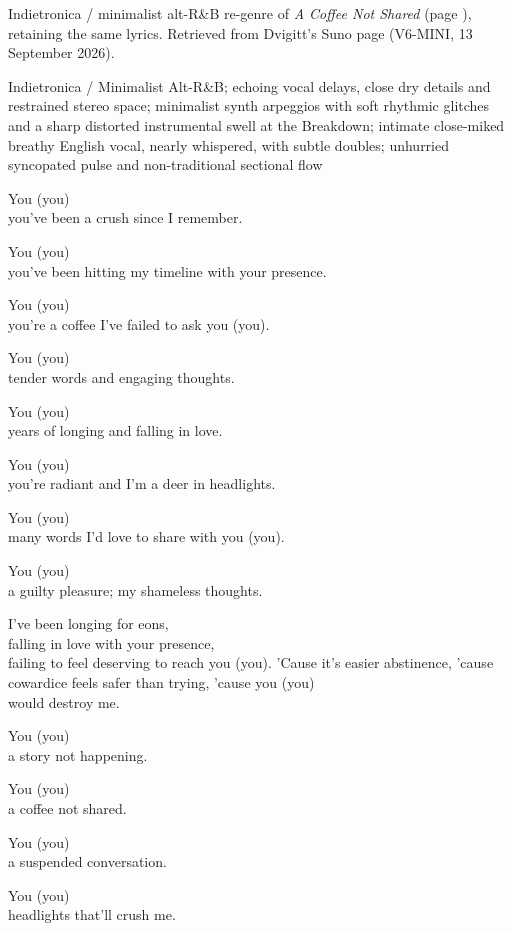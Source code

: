 
\begin{notes}
Indietronica / minimalist alt-R\&B re-genre of \emph{A Coffee Not Shared} (page \pageref{sec:a-coffee-not-shared}), retaining the same lyrics. Retrieved from Dvigitt's Suno page (V6-MINI, 13 September 2026).
\end{notes}
\begin{style}
Indietronica / Minimalist Alt-R\&B; echoing vocal delays, close dry details and restrained stereo space; minimalist synth arpeggios with soft rhythmic glitches and a sharp distorted instrumental swell at the Breakdown; intimate close-miked breathy English vocal, nearly whispered, with subtle doubles; unhurried syncopated pulse and non-traditional sectional flow
\end{style}
\begin{lyrics}
You (you)\\
you've been a crush since I remember.

You (you)\\
you've been hitting my timeline with your presence.

You (you)\\
you're a coffee I've failed to ask you (you).

You (you)\\
tender words and engaging thoughts.


You (you)\\
years of longing and falling in love.

You (you)\\
you're radiant and I'm a deer in headlights.

You (you)\\
many words I'd love to share with you (you).

You (you)\\
a guilty pleasure; my shameless thoughts.

I've been longing for eons,\\
falling in love with your presence,\\
failing to feel deserving to reach you (you).
'Cause it's easier abstinence,
'cause cowardice feels safer than trying,
'cause you (you)\\
would destroy me.

You (you)\\
a story not happening.

You (you)\\
a coffee not shared.

You (you)\\
a suspended conversation.

You (you)\\
headlights that'll crush me.
\end{lyrics}

